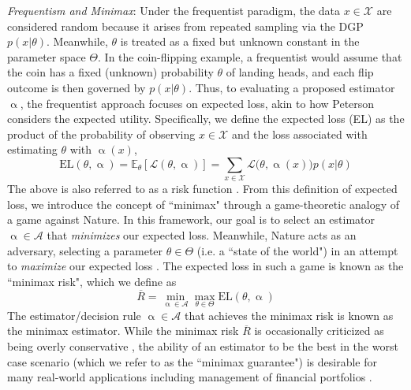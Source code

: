 \documentclass[letterpaper,12pt]{article}
\newcommand{\given}{|}
\begin{document}
\textit{Frequentism and Minimax}: Under the frequentist paradigm, the data $x \in \mathcal{X}$ are considered random because it arises from repeated sampling via the DGP $p(x \given \theta)$. Meanwhile, $\theta$ is treated as a fixed but unknown constant in the parameter space $\Theta$. In the coin-flipping example, a frequentist would assume that the coin has a fixed (unknown) probability $\theta$ of landing heads, and each flip outcome is then governed by $p(x\given \theta)$. Thus, to evaluating a proposed estimator $\upalpha$, the frequentist approach focuses on expected loss, akin to how Peterson \cite{peterson2017} considers the expected utility. Specifically, we define the expected loss (EL) as the product of the probability of observing $x \in \mathcal{X}$ and the loss associated with estimating $\theta$ with $\upalpha(x)$,
\begin{equation}
 \text{EL}(\theta, \upalpha) = \mathbb{E}_{\theta}[\mathcal{L}(\theta, \upalpha)] = \sum_{x \in \mathcal{X}} \mathcal{L}\big( \theta, \upalpha(x) \big) p(x \given \theta)  \label{eq:freqexpectedloss}
\end{equation}
The above is also referred to as a risk function \cite{nikulin2001}. From this definition of expected loss, we introduce the concept of ``minimax" through a game-theoretic analogy of a game against Nature. In this framework, our goal is to select an estimator $\upalpha \in \mathcal{A}$ that \textit{minimizes} our expected loss. Meanwhile, Nature acts as an adversary, selecting a parameter $\theta \in \Theta$ (i.e. a ``state of the world") in an attempt to \textit{maximize} our expected loss \cite{ulansky2021}. The expected loss in such a game is known as the ``minimax risk", which we define as
\begin{equation}
\overline{{R}} = \min_{\upalpha \in \mathcal{A}} \max_{\theta \in \Theta} \text{EL}(\theta, \upalpha) \label{eq:minimaxrisk}
\end{equation}
The estimator/decision rule $\upalpha \in \mathcal{A}$ that achieves the minimax risk is known as the minimax estimator. While the minimax risk $\overline{R}$ is occasionally criticized as being overly conservative \cite{peterson2017}, the ability of an estimator to be the best in the worst case scenario (which we refer to as the ``minimax guarantee") is desirable for many real-world applications including management of financial portfolios \cite{DENG2005278}.
\end{document}
